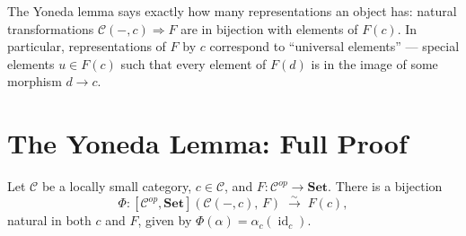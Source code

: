 The Yoneda lemma says exactly how many representations an object has: natural
transformations $\mathcal{C}(-,c) \Rightarrow F$ are in bijection with elements
of $F(c)$. In particular, representations of $F$ by $c$ correspond to
``universal elements'' — special elements $u \in F(c)$ such that every
element of $F(d)$ is in the image of some morphism $d \to c$.

\section{The Yoneda Lemma: Full Proof}

\begin{theorem}
Let $\mathcal{C}$ be a locally small category, $c \in \mathcal{C}$, and
$F : \mathcal{C}^{op} \to \mathbf{Set}$. There is a bijection
\[
  \Phi : [\mathcal{C}^{op}, \mathbf{Set}](\mathcal{C}(-,c),\, F) \;\xrightarrow{\sim}\; F(c),
\]
natural in both $c$ and $F$, given by $\Phi(\alpha) = \alpha_c(\operatorname{id}_c)$.
\end{theorem}


